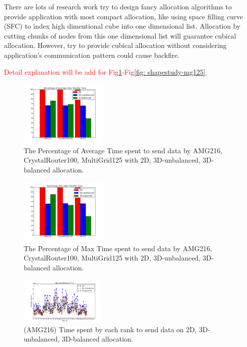 \documentclass[conference]{IEEEtran}
\begin{document}
There are lots of research work try to design fancy allocation algorithms to provide application with most compact allocation, like using space filling curve (SFC) to index high dimentional cube into one dimensional list. Allocation by cutting chunks of nodes from this one dimensional list will guarantee cubical allocation. However, try to provide cubical allocation without considering application's communication pattern could cause backfire.

\textcolor{red}{Detail explanation will be add for Fig\ref{fig: shapestudy-avgtime}-Fig\ref{fig: shapestudy-mg125}.}

\begin{figure}[h!] 
  \centering
  \includegraphics[width=0.38\textwidth]{figs/shapestudy/avgtime}
   \caption{The Percentage of Average Time spent to send data by AMG216, CrystalRouter100, MultiGrid125 with 2D, 3D-unbalanced, 3D-balanced allocation.}
   \label{fig: shapestudy-avgtime}
\end{figure}

\begin{figure}[h!] 
  \centering
  \includegraphics[width=0.38\textwidth]{figs/shapestudy/maxtime}
   \caption{The Percentage of Max Time spent to send data by AMG216, CrystalRouter100, MultiGrid125 with 2D, 3D-unbalanced, 3D-balanced allocation.}
   \label{fig: shapestudy-maxtime}
\end{figure}

\begin{figure}[h!] 
  \centering
  \includegraphics[width=0.38\textwidth]{figs/shapestudy/amg216_rank_msgtime}
   \caption{(AMG216) Time spent by each rank to send data on 2D, 3D-unbalanced, 3D-balanced allocation. }
   \label{fig: shapestudy-amg216}
\end{figure}
\end{document}
